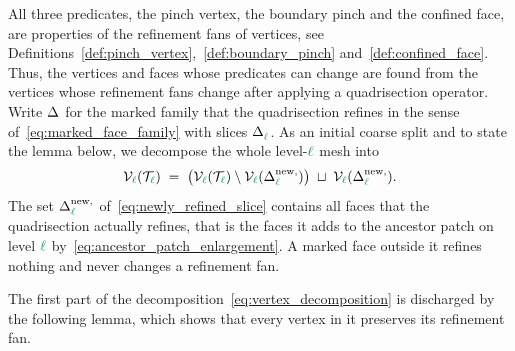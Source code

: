 \documentclass[a4paper, 12pt]{article}
\makeatletter
\newcommand{\green}{\color{ForestGreen}}
\newcommand{\T}{\mathcal{T}}
\newcommand{\V}{\mathcal{V}}
\DeclareRobustCommand{\simplexsubsetTwo}[2][]{\Delta\ifx\@empty#1\@empty\else^{#1}\fi_{#2}}
\DeclareRobustCommand{\simplexsubsetNew}[2][]{\Delta^{\mathrm{new}\ifx\@empty#1\@empty\else,#1\fi}_{#2}}
\renewcommand{\l}{{\green\ell}}
\theoremstyle{definition}
\theoremstyle{plain}
\numberwithin{equation}{section}
\makeatother
\begin{document}
\smallskip

All three predicates, the pinch vertex, the boundary pinch and the confined face, are properties of the refinement fans of vertices, see Definitions~\ref{def:pinch_vertex},~\ref{def:boundary_pinch} and~\ref{def:confined_face}. Thus, the vertices and faces whose predicates can change are found from the vertices whose refinement fans change after applying a quadrisection operator. Write $\simplexsubsetTwo{}$ for the marked family that the quadrisection refines in the sense of~\eqref{eq:marked_face_family} with slices $\simplexsubsetTwo{\l}$. As an initial coarse split and to state the lemma below, we decompose the whole level-$\l$ mesh into
\begin{equation}
    \label{eq:vertex_decomposition}
    \V_\l(\T_\l) \; = \; \big( \V_\l(\T_\l) \setminus \V_\l ( \simplexsubsetNew{\l} ) \big) \; \sqcup \; \V_\l ( \simplexsubsetNew{\l} ) .
\end{equation}
The set $\simplexsubsetNew{\l}$ of~\eqref{eq:newly_refined_slice} contains all faces that the quadrisection actually refines, that is the faces it adds to the ancestor patch on level $\l$ by~\eqref{eq:ancestor_patch_enlargement}. A marked face outside it refines nothing and never changes a refinement fan.

\smallskip

The first part of the decomposition~\eqref{eq:vertex_decomposition} is discharged by the following lemma, which shows that every vertex in it preserves its refinement fan.
\end{document}

